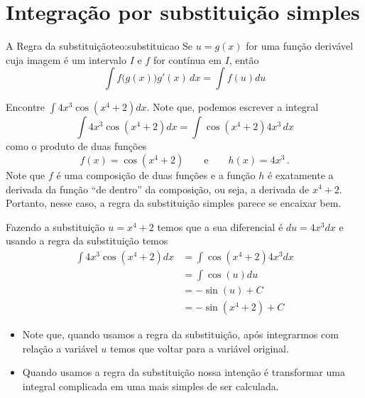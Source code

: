 \section{Integração por substituição simples}
\label{sec:Integracao_substituicao_simples}

\begin{teorema}{A Regra da substituição}{teo:substituicao}
  Se $u=g(x)$ for uma função derivável cuja imagem é um intervalo
  $I$ e $f$ for contínua em $I$, então
  \[
    \int f\big(g(x)\big) g'(x) \,dx = \int f(u) du
  \]
\end{teorema}

\begin{example}
  Encontre \(\int 4x^3 \cos\left(x^4+2\right)dx\).
  \solution
  Note que, podemos escrever a integral
  \[
    \int 4x^3 \cos\left(x^4+2\right)dx =  \int  \cos\left(x^4+2\right) 4x^3\,dx
  \]
  como o produto de duas funções
  \[
    f(x) = \cos\left(x^4+2\right) \qquad \text{e} \qquad
    h(x) = 4x^3 \,.
  \]
  Note que $f$
  é uma composição de duas funções e a função $h$ é exatamente a derivada da
  função ``de dentro'' da composição, ou seja, a derivada de $x^4+2$. Portanto,
  nesse caso, a regra da substituição simples parece se encaixar bem.

  Fazendo a substituição $u=x^4+2$ temos que a sua diferencial é $du=4x^3dx$ e
  usando a regra da substituição temos
  \begin{align*}
    \int 4x^3 \cos\left(x^4+2\right)dx
    & = \int  \cos\left(x^4+2\right) 4x^3dx \\
    & = \int \cos(u) du \\
    & = -\sin(u)+C \\
    & = -\sin\left(x^4+2\right)+C
  \end{align*}
\end{example}

\begin{itemize}
  \item Note que, quando usamos a regra da substituição, após integrarmos com
      relação a variável $u$ temos que voltar para a variável original.

  \item Quando usamos a regra da substituição nossa intenção é transformar uma
      integral complicada em uma mais simples de ser calculada.

\end{itemize}

